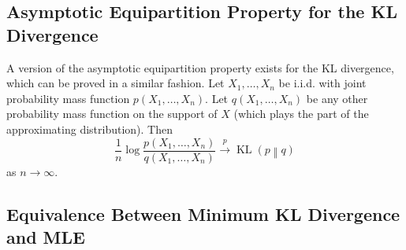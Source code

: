 \documentclass[11pt]{report} %
\begin{document}
\subsection{Asymptotic Equipartition Property for the KL Divergence}

A version of the asymptotic equipartition property exists for the KL divergence, which can be proved in a similar fashion. Let $X_{1}, \dots, X_{n}$ be i.i.d. with joint probability mass function $p\left(X_{1}, \dots, X_{n}\right)$. Let $q\left(X_{1}, \dots, X_{n}\right)$ be any other probability mass function on the support of $X$ (which plays the part of the approximating distribution). Then
\begin{equation}
\dfrac{1}{n}\log\dfrac{p\left(X_{1}, \dots, X_{n}\right)}{q\left(X_{1}, \dots, X_{n}\right)} \overset{p}{\to} \operatorname{KL}\left(p\middle\Vert q\right)
\end{equation}
as $n\to\infty$.

\subsection{Equivalence Between Minimum KL Divergence and MLE}
\end{document}
